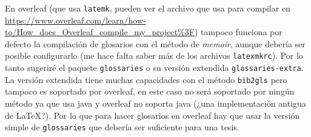 En overleaf (que usa \texttt{latemk}, pueden ver el archivo que usa para
compilar en \url{https://www.overleaf.com/learn/how-to/How_does_Overleaf_compile_my_project%3F}) tampoco funciona por defecto la
compilación de glosarios con el método de \textit{memoir}, aunque debería
ser posible configurarlo (me hace falta saber más de los archivos
\texttt{latexmkrc}). Por lo tanto sugeriré el paquete \texttt{glossaries} o
su versión extendida \texttt{glossaries-extra}. La versión extendida tiene
muchas capacidades con el método \texttt{bib2gls} pero tampoco es soportado
por overleaf, en este caso no será soportado por ningún método ya que usa
java y overleaf no soporta java (¿una implementación antigua de \LaTeX?).
Por lo que para hacer glosarios en overleaf hay que usar la versión simple
de \texttt{glossaries} que debería ser suficiente para una tesis.
